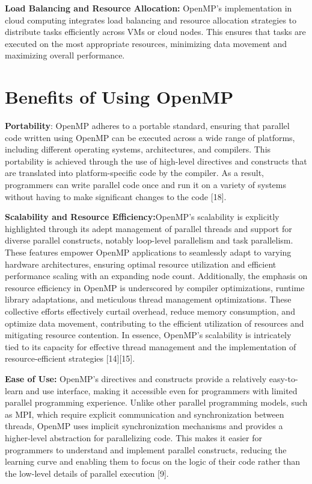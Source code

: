 \documentclass[12pt,conference]{IEEEtran}
\begin{document}
\textbf{Load Balancing and Resource Allocation:} OpenMP's implementation in cloud computing integrates load balancing and resource allocation strategies to distribute tasks efficiently across VMs or cloud nodes. This ensures that tasks are executed on the most appropriate resources, minimizing data movement and maximizing overall performance.

\section{Benefits of Using OpenMP}

\textbf{Portability}: OpenMP adheres to a portable standard, ensuring that parallel code written using OpenMP can be executed across a wide range of platforms, including different operating systems, architectures, and compilers. This portability is achieved through the use of high-level directives and constructs that are translated into platform-specific code by the compiler. As a result, programmers can write parallel code once and run it on a variety of systems without having to make significant changes to the code [18]. 

\textbf{Scalability and Resource Efficiency:}OpenMP's scalability is explicitly highlighted through its adept management of parallel threads and support for diverse parallel constructs, notably loop-level parallelism and task parallelism. These features empower OpenMP applications to seamlessly adapt to varying hardware architectures, ensuring optimal resource utilization and efficient performance scaling with an expanding node count. Additionally, the emphasis on resource efficiency in OpenMP is underscored by compiler optimizations, runtime library adaptations, and meticulous thread management optimizations. These collective efforts effectively curtail overhead, reduce memory consumption, and optimize data movement, contributing to the efficient utilization of resources and mitigating resource contention. In essence, OpenMP's scalability is intricately tied to its capacity for effective thread management and the implementation of resource-efficient strategies [14][15]. 

\textbf{Ease of Use:} OpenMP's directives and constructs provide a relatively easy-to-learn and use interface, making it accessible even for programmers with limited parallel programming experience. Unlike other parallel programming models, such as MPI, which require explicit communication and synchronization between threads, OpenMP uses implicit synchronization mechanisms and provides a higher-level abstraction for parallelizing code. This makes it easier for programmers to understand and implement parallel constructs, reducing the learning curve and enabling them to focus on the logic of their code rather than the low-level details of parallel execution [9]. 
\end{document}
